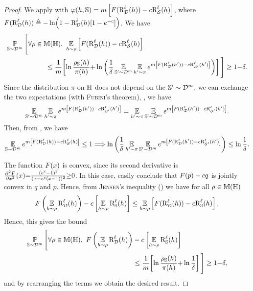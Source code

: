 \begin{noaddcontents}
\disintegratedcatoni*
\begin{proof}
We apply  with $\varphi(h,\mathbb{S}) = m\left[F(\text{R}^{\ell}_{\mathcal{D}}(h))-c\text{R}^{\ell}_{\mathcal{S}}(h)\right]$, where $F(\text{R}^{\ell}_{\mathcal{D}}(h))\triangleq-\ln\!\left( 1-\text{R}^{\ell}_{\mathcal{D}}(h)\!\left[1-e^{-c}\right]\right)$.
We have
\begin{align*}
    \PP_{\S\sim\D^\m}\Bigg[\forall\Q\in\M(\H),\   &\EE_{\h\sim\Q}\LB\catF(\RiskLoss_{\D}(\h))-\cat\RiskLoss_{\dS}(\h)\RB\\
    &\hspace{-1cm}\le \frac{1}{\m}\!\LB\ln\frac{\AQ(\h)}{\P(\h)}{+}\ln\LP\frac{1}{\delta}\EE_{\S'\sim\D^\m}\EE_{\h'\sim\P}e^{\m\LB\catF(\RiskLoss_{\D}(\h'))-\cat\RiskLoss_{\dS'}(\h')\RB}\RP\RB\Bigg] \ge 1{-}\delta.
\end{align*}
Since the distribution $\pi$ on $\mathbb{H}$ does not depend on the $\mathbb{S}'\sim\mathcal{D}^m$, we can exchange the two expectations (with \textsc{Fubini}'s theorem), \ie, we have 
\begin{align*}
\operatorname*{\mathbb{E}}_{\mathbb{S}'\sim\mathcal{D}^m}\operatorname*{\mathbb{E}}_{h'\sim\pi}e^{m\left[F(\text{R}^{\ell}_{\mathcal{D}}(h'))-c\text{R}^{\ell}_{\mathcal{S}'}(h')\right]} = \operatorname*{\mathbb{E}}_{h'\sim\pi}\operatorname*{\mathbb{E}}_{\mathbb{S}'\sim\mathcal{D}^m}e^{m\left[F(\text{R}^{\ell}_{\mathcal{D}}(h'))-c\text{R}^{\ell}_{\mathcal{S}'}(h')\right]}.
\end{align*}
Then, from , we have
\begin{align*}
    \operatorname*{\mathbb{E}}_{\mathbb{S}\sim\mathcal{D}^m}e^{m\left[F(\text{R}^{\ell}_{\mathcal{D}}(h))-c\text{R}^{\ell}_{\mathcal{S}}(h)\right]} \le 1 \Longrightarrow  \ln\left(\frac{1}{\delta}\operatorname*{\mathbb{E}}_{h'\sim\pi}\operatorname*{\mathbb{E}}_{\mathbb{S}'\sim\mathcal{D}^m}e^{m\left[F(\text{R}^{\ell}_{\mathcal{D}}(h'))-c\text{R}^{\ell}_{\mathcal{S}'}(h')\right]}\right) \le \ln\frac{1}{\delta}.
\end{align*}

The function $F(x)$ is convex, since its second derivative is $\frac{\partial^2F}{\partial x^2}(x) {=} \frac{(e^c-1)^2}{(x-e^c(x-1))^2}{\ge} 0$.
In this case, easily conclude that $F(p)-c q$ is jointly convex in $q$ and $p$.
Hence, from \textsc{Jensen}'s inequality () we have for all $\rho\in\mathbb{M}(\mathbb{H})$
\begin{align*}
F\left(\operatorname*{\mathbb{E}}_{h\sim\rho}\text{R}^{\ell}_{\mathcal{D}}(h)\right)-c\left[\operatorname*{\mathbb{E}}_{h\sim\rho}\text{R}^{\ell}_{\mathbb{S}}(h)\right] \le \operatorname*{\mathbb{E}}_{h\sim\rho}\left[ F(\text{R}^{\ell}_{\mathcal{D}}(h))-c\text{R}^{\ell}_{\mathbb{S}}(h) \right].
\end{align*}
Hence, this gives the bound 
\begin{align*}
    \PP_{\S\sim\D^\m}\Bigg[\forall\Q\in\M(\H),\ \catF\LP\EE_{\h\sim\Q}\RiskLoss_{\D}(\h)\RP&-\cat\LB\EE_{\h\sim\Q}\RiskLoss_{\S}(\h)\RB\\
    &\le \frac{1}{\m}\!\LB\ln\frac{\AQ(\h)}{\P(\h)}{+}\ln\frac{1}{\delta}\RB\Bigg] \ge 1{-}\delta,
\end{align*}
and by rearranging the terms we obtain the desired result.
\end{proof}


\end{noaddcontents}

